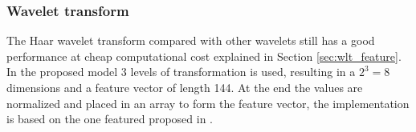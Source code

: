 \subsubsection{Wavelet transform}
\label{sec:meth:featextr:wt}
The Haar wavelet transform compared with other wavelets still has a good performance at cheap computational cost explained in Section \ref{sec:wlt_feature}. In the proposed model 3 levels of transformation is used, resulting in a $2^3 = 8$ dimensions and a feature vector of length 144. At the end the values are normalized and placed in an array to form the feature vector, the implementation is based on the one featured proposed in \cite{wang2015new}.

